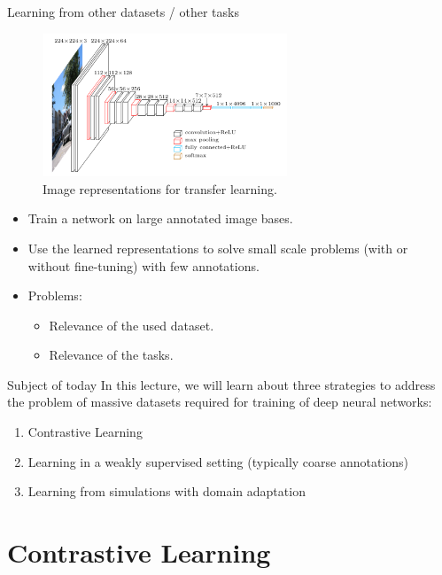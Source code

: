 \documentclass[xcolor=pdftex,dvipsnames,table]{beamer}
\begin{document}
\begin{frame}{Learning from other datasets / other tasks}
\begin{figure}[htb]
   \centering
   \includegraphics[width=0.65\textwidth]{../graphics/vgg16.png}
   \caption{Image representations for transfer learning.}
\end{figure}
\begin{itemize}
   \item Train a network on large annotated image bases.
   \item Use the learned representations to solve small scale problems (with or without fine-tuning) with few annotations.
   \item Problems:
   \begin{itemize}
   	\item Relevance of the used dataset.
   	\item Relevance of the tasks. 
   \end{itemize}
\end{itemize}
\end{frame}

\begin{frame}{Subject of today}
In this lecture, we will learn about three strategies to address the problem of massive datasets required for training of deep neural networks:
\begin{enumerate}
\item Contrastive Learning
\item Learning in a weakly supervised setting (typically coarse annotations)
\item Learning from simulations with domain adaptation
\end{enumerate}
\end{frame}

\section{Contrastive Learning}
\end{document}
